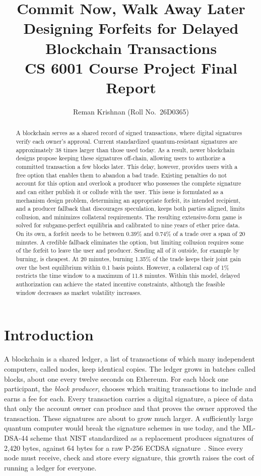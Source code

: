 \documentclass[11pt]{article}
\title{Commit Now, Walk Away Later\\ Designing Forfeits for Delayed Blockchain Transactions\\ \large CS 6001 Course Project Final Report}
\author{Reman Krishnan (Roll No.\ 26D0365)}
\date{}
\begin{document}
\maketitle

\begin{abstract}
A blockchain serves as a shared record of signed transactions, where digital signatures verify each owner's approval. Current standardized quantum-resistant signatures are approximately 38 times larger than those used today. As a result, newer blockchain designs propose keeping these signatures off-chain, allowing users to authorize a committed transaction a few blocks later. This delay, however, provides users with a free option that enables them to abandon a bad trade. Existing penalties do not account for this option and overlook a producer who possesses the complete signature and can either publish it or collude with the user. This issue is formulated as a mechanism design problem, determining an appropriate forfeit, its intended recipient, and a producer fallback that discourages speculation, keeps both parties aligned, limits collusion, and minimizes collateral requirements. The resulting extensive-form game is solved for subgame-perfect equilibria and calibrated to nine years of ether price data. On its own, a forfeit needs to be between 0.39\% and 0.74\% of a trade over a span of 20 minutes. A credible fallback eliminates the option, but limiting collusion requires some of the forfeit to leave the user and producer. Sending all of it outside, for example by burning, is cheapest. At 20 minutes, burning 1.35\% of the trade keeps their joint gain over the best equilibrium within 0.1 basis points. However, a collateral cap of 1\% restricts the time window to a maximum of 11.8 minutes. Within this model, delayed authorization can achieve the stated incentive constraints, although the feasible window decreases as market volatility increases.
\end{abstract}

\section{Introduction}
A blockchain is a shared ledger, a list of transactions of which many independent computers, called nodes, keep identical copies. The ledger grows in batches called blocks, about one every twelve seconds on Ethereum. For each block one participant, the \emph{block producer}, chooses which waiting transactions to include and earns a fee for each. Every transaction carries a digital signature, a piece of data that only the account owner can produce and that proves the owner approved the transaction. These signatures are about to grow much larger. A sufficiently large quantum computer would break the signature schemes in use today, and the ML-DSA-44 scheme that NIST standardized as a replacement produces signatures of 2,420 bytes, against 64 bytes for a raw P-256 ECDSA signature~\cite{fips204,fips186}. Since every node must receive, check and store every signature, this growth raises the cost of running a ledger for everyone.
\end{document}
